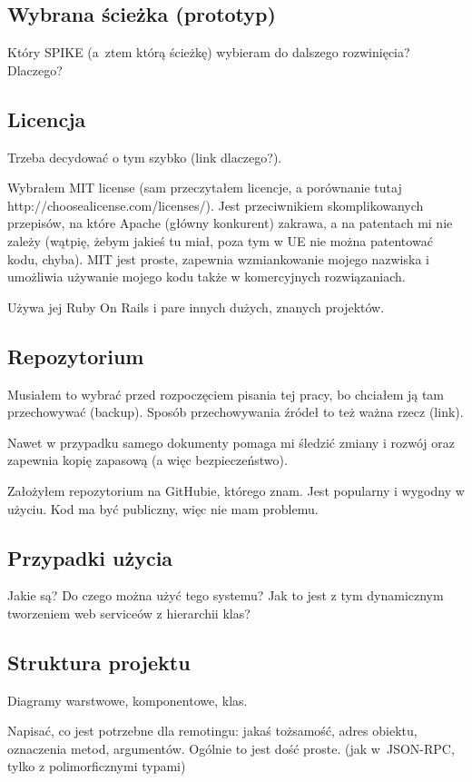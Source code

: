 \subsection{Wybrana ścieżka (prototyp)}
Który SPIKE (a~ztem którą ścieżkę) wybieram do dalszego rozwinięcia?
Dlaczego?

\subsection{Licencja}
Trzeba decydować o tym szybko (link dlaczego?).

Wybrałem MIT license (sam przeczytałem licencje, a porównanie tutaj http://choosealicense.com/licenses/). Jest przeciwnikiem skomplikowanych przepisów, na które Apache (główny konkurent) zakrawa, a na patentach mi nie zależy (wątpię, żebym jakieś tu miał, poza tym w UE nie można patentować kodu, chyba). MIT jest proste, zapewnia wzmiankowanie mojego nazwiska i umożliwia używanie mojego kodu także w komercyjnych rozwiązaniach.

Używa jej Ruby On Rails i pare innych dużych, znanych projektów.

\subsection{Repozytorium}
Musiałem to wybrać przed rozpoczęciem pisania tej pracy, bo chciałem ją tam przechowywać (backup). Sposób przechowywania źródeł to też ważna rzecz (link).

Nawet w przypadku samego dokumenty pomaga mi śledzić zmiany i rozwój oraz zapewnia kopię zapasową (a więc bezpieczeństwo).

Założyłem repozytorium na GitHubie, którego znam. Jest popularny i wygodny w użyciu. Kod ma być publiczny, więc nie mam problemu. 




\subsection{Przypadki użycia}
Jakie są? Do czego można użyć tego systemu? Jak to jest z tym dynamicznym tworzeniem web serviceów z hierarchii klas?



\subsection{Struktura projektu}
Diagramy warstwowe, komponentowe, klas.

Napisać, co jest potrzebne dla remotingu: jakaś tożsamość, adres obiektu, oznaczenia metod, argumentów. Ogólnie to jest dość proste. (jak w~JSON-RPC, tylko z polimorficznymi typami)

